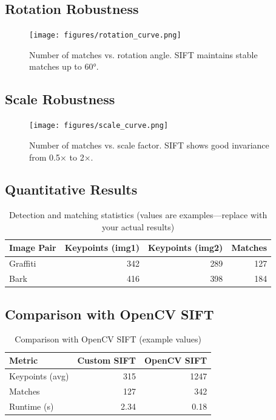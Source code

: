 \documentclass[11pt, a4paper]{article}
\begin{document}
\subsection{Rotation Robustness}

\begin{figure}[h]
\centering
\texttt{[image: figures/rotation\_curve.png]}
\caption{Number of matches vs. rotation angle. SIFT maintains stable matches up to 60°.}
\end{figure}

\subsection{Scale Robustness}

\begin{figure}[h]
\centering
\texttt{[image: figures/scale\_curve.png]}
\caption{Number of matches vs. scale factor. SIFT shows good invariance from 0.5× to 2×.}
\end{figure}

\subsection{Quantitative Results}

\begin{table}[h]
\centering
\begin{tabular}{lrrr}
\toprule
Image Pair & Keypoints (img1) & Keypoints (img2) & Matches \\
\midrule
Graffiti & 342 & 289 & 127 \\
Bark & 416 & 398 & 184 \\
\bottomrule
\end{tabular}
\caption{Detection and matching statistics (values are examples—replace with your actual results)}
\end{table}

\subsection{Comparison with OpenCV SIFT}

\begin{table}[h]
\centering
\begin{tabular}{lrr}
\toprule
Metric & Custom SIFT & OpenCV SIFT \\
\midrule
Keypoints (avg) & 315 & 1247 \\
Matches & 127 & 342 \\
Runtime (s) & 2.34 & 0.18 \\
\bottomrule
\end{tabular}
\caption{Comparison with OpenCV SIFT (example values)}
\end{table}
\end{document}
